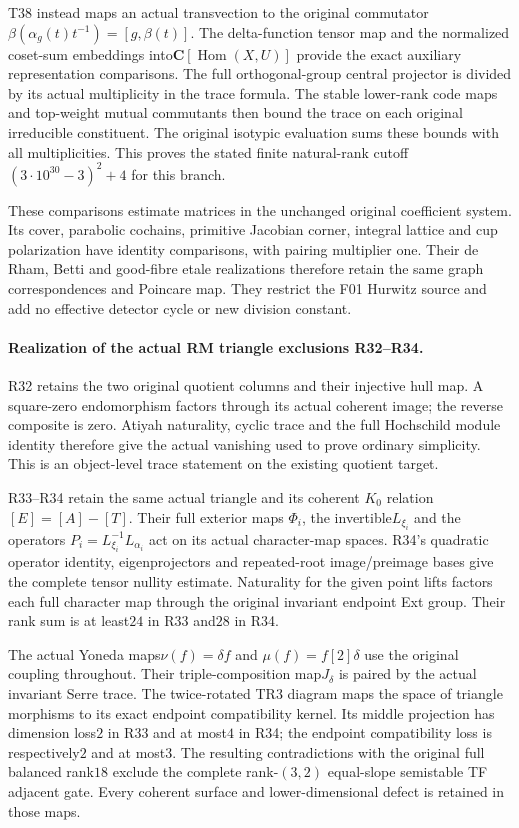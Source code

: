 T38 instead maps an actual transvection to the original
commutator$\beta(\alpha_g(t)t^{-1})=[g,\beta(t)]$.
The delta-function tensor map and the normalized coset-sum
embeddings into$\mathbf C[\operatorname{Hom}(X,U)]$ provide
the exact auxiliary representation comparisons. The full
orthogonal-group central projector is divided by its actual
multiplicity in the trace formula. The stable lower-rank code
maps and top-weight mutual commutants then bound the trace
on each original irreducible constituent. The original
isotypic evaluation sums these bounds with all multiplicities.
This proves the stated finite natural-rank cutoff
$(3\cdot10^{30}-3)^2+4$ for this branch.

These comparisons estimate matrices in the unchanged original
coefficient system. Its cover, parabolic cochains, primitive
Jacobian corner, integral lattice and cup polarization have
identity comparisons, with pairing multiplier one. Their
de Rham, Betti and good-fibre etale realizations therefore
retain the same graph correspondences and Poincare map.
They restrict the F01 Hurwitz source and add no effective
detector cycle or new division constant.

\paragraph{Realization of the actual RM triangle exclusions R32--R34.}
R32 retains the two original quotient columns and their
injective hull map. A square-zero endomorphism factors through
its actual coherent image; the reverse composite is zero.
Atiyah naturality, cyclic trace and the full Hochschild module
identity therefore give the actual vanishing used to prove
ordinary simplicity. This is an object-level trace statement
on the existing quotient target.

R33--R34 retain the same actual triangle and its coherent
$K_0$ relation$[E]=[A]-[T]$. Their full exterior maps
$\Phi_i$, the invertible$L_{\xi_i}$ and the operators
$P_i=L_{\xi_i}^{-1}L_{\alpha_i}$ act on its actual
character-map spaces. R34's quadratic operator identity,
eigenprojectors and repeated-root image/preimage bases
give the complete tensor nullity estimate. Naturality
for the given point lifts factors each full character
map through the original invariant endpoint Ext group.
Their rank sum is at least$24$ in R33 and$28$ in R34.

The actual Yoneda maps$\nu(f)=\delta f$ and
$\mu(f)=f[2]\delta$ use the original coupling throughout.
Their triple-composition map$J_\delta$ is paired by the
actual invariant Serre trace. The twice-rotated TR3 diagram
maps the space of triangle morphisms to its exact endpoint
compatibility kernel. Its middle projection has dimension
loss$2$ in R33 and at most$4$ in R34; the endpoint
compatibility loss is respectively$2$ and at most$3$.
The resulting contradictions with the original full balanced
rank$18$ exclude the complete rank-$(3,2)$ equal-slope
semistable TF adjacent gate. Every coherent surface and
lower-dimensional defect is retained in those maps.

